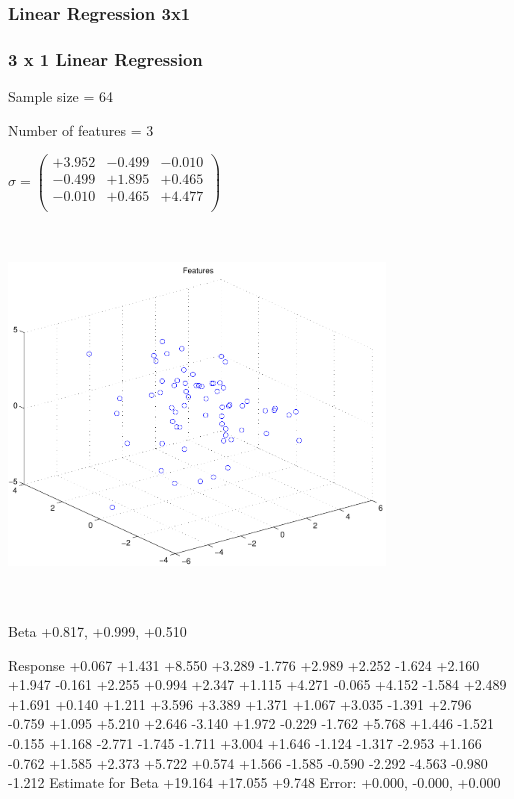 \documentclass[9pt]{article}
\theoremstyle{plain}
\theoremstyle{definition}
\theoremstyle{remark}
\numberwithin{equation}{section}
\begin{document}
\subsubsection{Linear Regression 3x1}
\subsubsection{3 x 1 Linear Regression}
Sample size = 64

Number of features = 3

$\sigma = \left(
\begin{array}{
ccc}
+3.952 & -0.499 & -0.010 \\
-0.499 & +1.895 & +0.465 \\
-0.010 & +0.465 & +4.477 \\
\end{array}
\right)$ \newline 

\includegraphics[width=10.0cm,height=10.0cm]{regression_features.pdf}

Beta
+0.817, +0.999, +0.510

Response
+0.067
+1.431
+8.550
+3.289
-1.776
+2.989
+2.252
-1.624
+2.160
+1.947
-0.161
+2.255
+0.994
+2.347
+1.115
+4.271
-0.065
+4.152
-1.584
+2.489
+1.691
+0.140
+1.211
+3.596
+3.389
+1.371
+1.067
+3.035
-1.391
+2.796
-0.759
+1.095
+5.210
+2.646
-3.140
+1.972
-0.229
-1.762
+5.768
+1.446
-1.521
-0.155
+1.168
-2.771
-1.745
-1.711
+3.004
+1.646
-1.124
-1.317
-2.953
+1.166
-0.762
+1.585
+2.373
+5.722
+0.574
+1.566
-1.585
-0.590
-2.292
-4.563
-0.980
-1.212
Estimate for Beta
+19.164
+17.055
+9.748
Error:
+0.000, -0.000, +0.000
\end{document}

